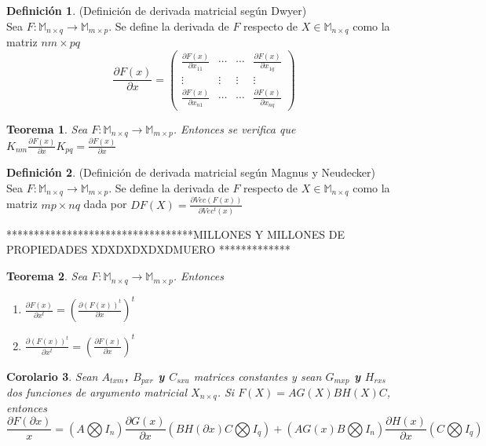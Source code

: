 \documentclass{article}
\theoremstyle{theorem-style}  %
\newtheorem{theorem}{Teorema}[section]  %
\newtheorem{corollary}[theorem]{Corolario} %
\theoremstyle{definition}
\newtheorem{definition}{Definición}[section]
\theoremstyle{example-style}
\begin{document}
\begin{definition}
	(Definición de derivada matricial según Dwyer)\\
	Sea $F:\mathbb{M}_{n\times q}\rightarrow \mathbb{M}_{m\times p}$. Se define la derivada de $F$ respecto de $X\in \mathbb{M}_{n\times q}$ como la matriz $nm\times pq$
	$$ \frac{\partial F(x)}{\partial x} = \left( \begin{array}{cccc}
	\frac{\partial F(x)}{\partial x_{11}} & \cdots & \cdots & \frac{\partial F(x)}{\partial x_{1q}}\\
	\vdots & \vdots & \vdots & \vdots \\
	\frac{\partial F(x)}{\partial x_{n1}} & \cdots & \cdots & \frac{\partial F(x)}{\partial x_{nq}}
	\end{array}\right)$$	
\end{definition}

\begin{theorem}
		Sea $F:\mathbb{M}_{n\times q}\rightarrow \mathbb{M}_{m\times p}$. Entonces se verifica que $K_{nm}\frac{\partial F(x)}{\partial x}K_{pq}= \frac{\partial F(x)}{\partial x}$
\end{theorem}

\begin{definition}
	(Definición de derivada matricial según Magnus y Neudecker)\\
	Sea $F:\mathbb{M}_{n\times q}\rightarrow \mathbb{M}_{m\times p}$. Se define la derivada de $F$ respecto de $X\in \mathbb{M}_{n\times q}$ como la matriz $mp\times nq$ dada por \textbf{$DF(X)=\frac{\partial Vec(F(x))}{\partial Vec^t(x)}$}
\end{definition}

**********************************MILLONES Y MILLONES DE PROPIEDADES XDXDXDXDXDMUERO *************

\begin{theorem}
	Sea $F:\mathbb{M}_{n\times q}\rightarrow \mathbb{M}_{m\times p}$. Entonces 
	\begin{enumerate}
		\item $\frac{\partial F(x)}{\partial x^t} =(\frac{\partial (F(x))^t}{\partial x})^t $
		
		\item $\frac{\partial (F(x))^t}{\partial x^t} =(\frac{\partial F(x)}{\partial x})^t$
	\end{enumerate}
\end{theorem}

\begin{corollary}
	Sean \textbf{$A_{txm}$, $B_{pxr}$ y $C_{sxu}$} matrices constantes y sean \textbf{$G_{mxp}$ y $H_{rxs}$} dos funciones de argumento matricial $X_{n\times 	q}$. Si \textbf{$F(X) = AG(X)BH(X)C$}, entonces
	\textbf{$$ \frac{\partial F(\partial x)}{x}= (A \bigotimes I_n)\frac{\partial G(x)}{\partial x}(BH(\partial x)C \bigotimes I_q) + (AG(x)B \bigotimes I_n)\frac{\partial H(x)}{\partial x}(C \bigotimes I_q)$$}
	 
\end{corollary}
\end{document}
